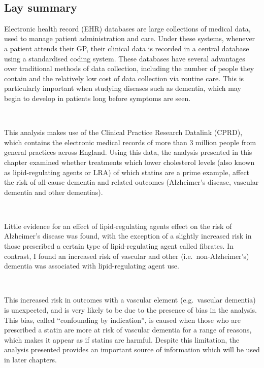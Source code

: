 \documentclass[a4paper, twoside]{templates/ociamthesis}
\begin{document}
~

\minitoc 

\begin{laybox}

\hypertarget{lay-summary-4}{%
\section*{Lay summary}\label{lay-summary-4}}

Electronic health record (EHR) databases are large collections of medical data, used to manage patient administration and care. Under these systems, whenever a patient attends their GP, their clinical data is recorded in a central database using a standardised coding system. These databases have several advantages over traditional methods of data collection, including the number of people they contain and the relatively low cost of data collection via routine care. This is particularly important when studying diseases such as dementia, which may begin to develop in patients long before symptoms are seen.

~

This analysis makes use of the Clinical Practice Research Datalink (CPRD), which contains the electronic medical records of more than 3 million people from general practices across England. Using this data, the analysis presented in this chapter examined whether treatments which lower cholesterol levels (also known as lipid-regulating agents or LRA) of which statins are a prime example, affect the risk of all-cause dementia and related outcomes (Alzheimer's disease, vascular dementia and other dementias).

~

Little evidence for an effect of lipid-regulating agents effect on the risk of Alzheimer's disease was found, with the exception of a slightly increased risk in those prescribed a certain type of lipid-regulating agent called fibrates. In contrast, I found an increased risk of vascular and other (i.e.~non-Alzheimer's) dementia was associated with lipid-regulating agent use.

~

This increased risk in outcomes with a vascular element (e.g.~vascular dementia) is unexpected, and is very likely to be due to the presence of bias in the analysis. This bias, called ``confounding by indication'', is caused when those who are prescribed a statin are more at risk of vascular dementia for a range of reasons, which makes it appear as if statins are harmful. Despite this limitation, the analysis presented provides an important source of information which will be used in later chapters.

\end{laybox}
\end{document}

